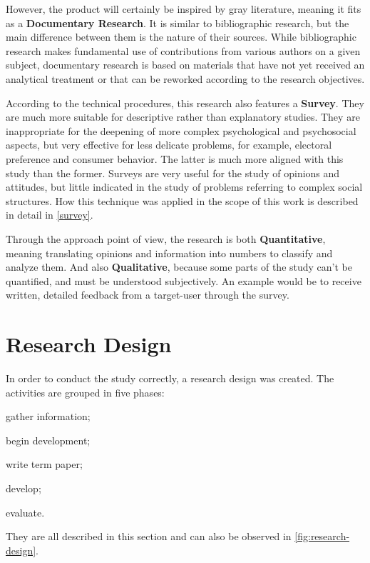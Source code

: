 However, the product will certainly be inspired by gray literature, meaning it fits as a \textbf{Documentary Research}. It is similar to bibliographic research, but the main difference between them is the nature of their sources. While bibliographic research makes fundamental use of contributions from various authors on a given subject, documentary research is based on materials that have not yet received an analytical treatment or that can be reworked according to the research objectives.

According to the technical procedures, this research also features a \textbf{Survey}. They are much more suitable for descriptive rather than explanatory studies. They are inappropriate for the deepening of more complex psychological and psychosocial aspects, but very effective for less delicate problems, for example, electoral preference and consumer behavior. The latter is much more aligned with this study than the former. Surveys are very useful for the study of opinions and attitudes, but little indicated in the study of problems referring to complex social structures. How this technique was applied in the scope of this work is described in detail in \autoref{survey}.

Through the approach point of view, the research is both \textbf{Quantitative}, meaning translating opinions and information into numbers to classify and analyze them. And also \textbf{Qualitative}, because some parts of the study can't be quantified, and must be understood subjectively. An example would be to receive written, detailed feedback from a target-user through the survey.

\section{Research Design}\label{sec:met-3}

In order to conduct the study correctly, a research design was created. The activities are grouped in five phases:
\begin{inparaenum}[(1)]
    \item gather information;
    \item begin development;
    \item write term paper;
    \item develop;
    \item evaluate.
\end{inparaenum}
They are all described in this section and can also be observed in \autoref{fig:research-design}.

